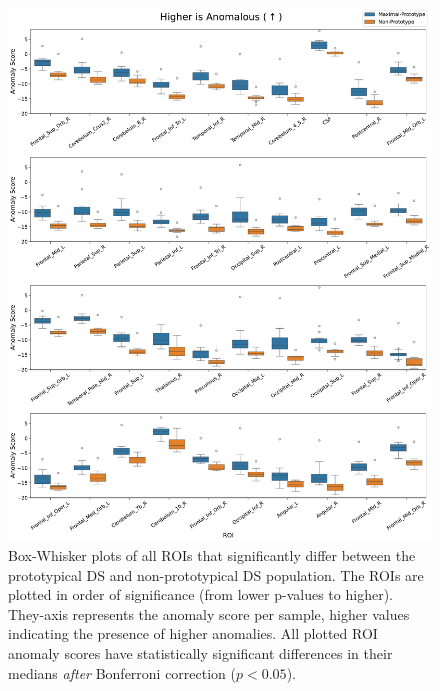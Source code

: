 \begin{figure}[ht]
\centering
\includegraphics[width=\textwidth]{figures/roi_full_boxplot.pdf}
\caption{Box-Whisker plots of all ROIs that significantly differ between the prototypical DS and non-prototypical DS population. The ROIs are plotted in order of significance (from lower p-values to higher).  They-axis represents the anomaly score per sample, higher values indicating the presence of higher anomalies. All plotted ROI anomaly scores have statistically significant differences in their medians \textit{after} Bonferroni correction ($p < 0.05$). }
\label{fig:roi-box-full-ds}
\end{figure}




